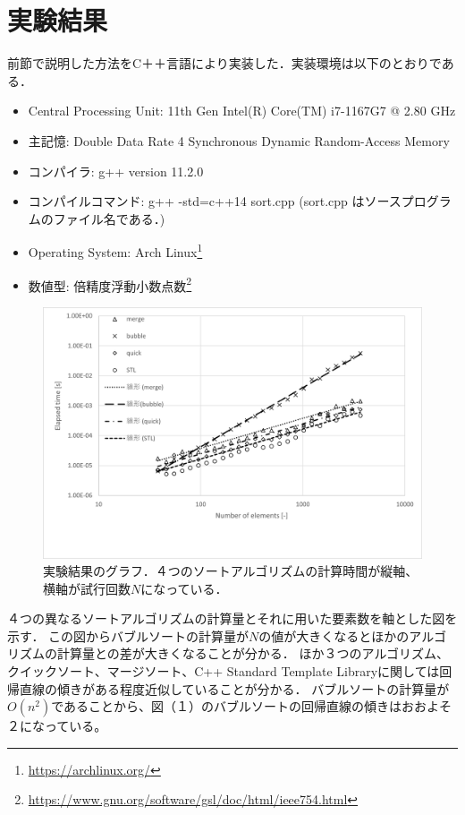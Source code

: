 \documentclass[fleqn, a4paper. 12pt]{ltjsarticle} %
\begin{document}
  \section{実験結果}
  前節で説明した方法をC＋＋言語により実装した．実装環境は以下のとおりである．
  \begin{itemize}
    \item Central Processing Unit: 11th Gen Intel(R) Core(TM) i7-1167G7 @ 2.80 GHz
    \item 主記憶: Double Data Rate 4 Synchronous Dynamic Random-Access Memory
    \item コンパイラ: g++ version 11.2.0
    \item コンパイルコマンド: g++ -std=c++14 sort.cpp (sort.cpp はソースプログラムのファイル名である．)
    \item Operating System: Arch Linux\footnote{\url{https://archlinux.org/}}
    \item 数値型: 倍精度浮動小数点数\footnote{\url{https://www.gnu.org/software/gsl/doc/html/ieee754.html}}
  \end{itemize}
  \begin{figure}[tb]
    \label{f1}
    \centering
    \includegraphics[width=\textwidth]{zu2.png}
    \caption{実験結果のグラフ．４つのソートアルゴリズムの計算時間が縦軸、横軸が試行回数$N$になっている．}
  \end{figure}
  ４つの異なるソートアルゴリズムの計算量とそれに用いた要素数を軸とした図を示す．
  この図からバブルソートの計算量が$N$の値が大きくなるとほかのアルゴリズムの計算量との差が大きくなることが分かる．
  ほか３つのアルゴリズム、クイックソート、マージソート、C++ Standard Template Libraryに関しては回帰直線の傾きがある程度近似していることが分かる．
  バブルソートの計算量が$O(n^2)$であることから、図（１）のバブルソートの回帰直線の傾きはおおよそ２になっている。
\end{document}
